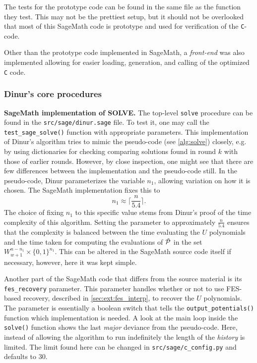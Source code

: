 The tests for the prototype code can be found in the same file as the function they test. This may not be the prettiest setup, but it should not be overlooked that most of this SageMath code is prototype and used for verification of the \texttt{C}-code.

Other than the prototype code implemented in SageMath, a \textit{front-end} was also implemented allowing for easier loading, generation, and calling of the optimized \texttt{C} code. 

\subsubsection{Dinur's core procedures}
\textbf{SageMath implementation of SOLVE.}
The top-level \texttt{solve} procedure can be found in the \texttt{src/sage/dinur.sage} file. To test it, one may call the \texttt{test\_sage\_solve()} function with appropriate parameters. This implementation of Dinur's algorithm tries to mimic the pseudo-code (see \cref{alg:solve}) closely, e.g. by using dictionaries for checking comparing solutions found in round $k$ with those of earlier rounds. However, by close inspection, one might see that there are few differences between the implementation and the pseudo-code still. In the pseudo-code, Dinur parameterizes the variable $n_1$, allowing variation on how it is chosen. The SageMath implementation fixes this to 
$$
    n_1 \approx \lceil \frac{n}{5.4} \rceil.
$$
The choice of fixing $n_1$ to this specific value stems from Dinur's proof of the time complexity of this algorithm. Setting the parameter to approximately $\frac{n}{5.4}$ ensures that the complexity is balanced between the time evaluating the $U$ polynomials and the time taken for computing the evaluations of $\Tilde{\mathcal{P}}$ in the set $W^{n - n_1}_{w + 1} \times \{0,1\}^{n_1}$. This can be altered in the SageMath source code itself if necessary, however, here it was kept simple.

Another part of the SageMath code that differs from the source material is its 
\texttt{fes\_recovery} parameter. This parameter handles whether or not to use FES-based recovery, described in \cref{sec:ext:fes_interp}, to recover the $U$ polynomials. The parameter is essentially a boolean switch that tells the \texttt{output\_potentials()} function which implementation is needed. A look at the main loop inside the \texttt{solve()} function shows the last \textit{major} deviance from the pseudo-code. Here, instead of allowing the algorithm to run indefinitely the length of the \textit{history} is limited. The limit found here can be changed in \texttt{src/sage/c\_config.py} and defaults to 30.

